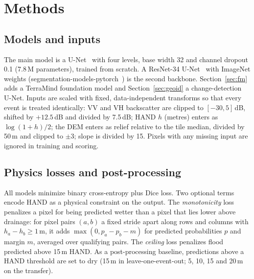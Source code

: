 \section{Methods}
\label{sec:methods}

\subsection{Models and inputs}
The main model is a U-Net~\cite{ronneberger2015unet} with four levels, base width 32 and channel
dropout 0.1 (7.8\,M parameters), trained from scratch. A ResNet-34 U-Net~\cite{he2016resnet} with
ImageNet weights (segmentation-models-pytorch~\cite{iakubovskii2019smp}) is the second backbone.
Section~\ref{sec:fm} adds a TerraMind foundation model and Section~\ref{sec:geoid} a change-detection
U-Net. Inputs are scaled with fixed, data-independent transforms so that every event is treated
identically: VV and VH backscatter are clipped to $[-30, 5]$\,dB, shifted by $+12.5$\,dB and divided by 7.5\,dB;
HAND $h$ (metres) enters as $\log(1+h)/2$; the DEM enters as relief relative to the tile median, divided
by 50\,m and clipped to $\pm 3$; slope is divided by 15\textdegree. Pixels with any missing input are
ignored in training and scoring.

\subsection{Physics losses and post-processing}
All models minimize binary cross-entropy plus Dice loss. Two optional terms encode HAND as a physical
constraint on the output. The \emph{monotonicity} loss penalizes a pixel for being predicted wetter than
a pixel that lies lower above drainage: for pixel pairs $(a,b)$ a fixed stride apart along rows and
columns with $h_a - h_b \ge 1$\,m, it adds $\max(0, p_a - p_b - m)$ for predicted probabilities $p$ and
margin $m$, averaged over qualifying pairs. The \emph{ceiling} loss penalizes flood predicted above
15\,m HAND. As a post-processing baseline, predictions above a HAND threshold are set to dry (15\,m in
leave-one-event-out; 5, 10, 15 and 20\,m on the transfer).

